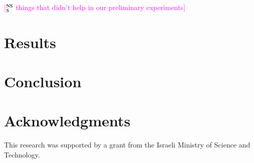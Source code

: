 \documentclass[11pt,letterpaper]{article}
\newcommand{\ensuretext}[1]{#1}
\newcommand{\nssmarker}{\ensuretext{\textcolor{magenta}{\ensuremath{^{\textsc{NS}}_{\textsc{S}}}}}}
\newcommand{\arkcomment}[3]{\ensuretext{\textcolor{#3}{[#1 #2]}}}
\newcommand{\nss}[1]{\arkcomment{\nssmarker}{#1}{magenta}}
\begin{document}
\nss{things that didn't help in our preliminary experiments}

\section{Results}
\label{sec:results}

\section{Conclusion}
\label{sec:conclusion}

\section*{Acknowledgments}
This research was supported by a grant from the Israeli Ministry of
Science and Technology.

\clearpage



\end{document}
